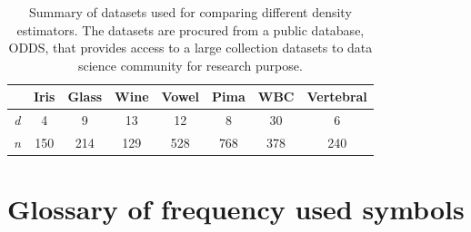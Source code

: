 \documentclass{article}
\begin{document}
\begin{table}
\centering
\caption{Summary of datasets used for comparing different density estimators. The datasets are procured from a public database, ODDS, that provides access to a large collection datasets to data science community for research purpose.}
\begin{tabular}{| c | c c c c c c c|}
\hline
& Iris & Glass  & Wine  & Vowel & Pima  & WBC  & Vertebral  \\
\hline
\textit{d} & 4                    & 9     & 13          & 12       & 8         & 30   & 6 \\
 \textit{n} & 150                & 214   & 129     & 528    & 768    & 378  & 240 \\
\hline
\end{tabular}
\label{tab:public_datasets}
\end{table} 

\section*{\refname}








 






\newpage

\appendix

\onecolumn

\section{Glossary of frequency used symbols} \label{apd:symbol_glossary}
\end{document}
